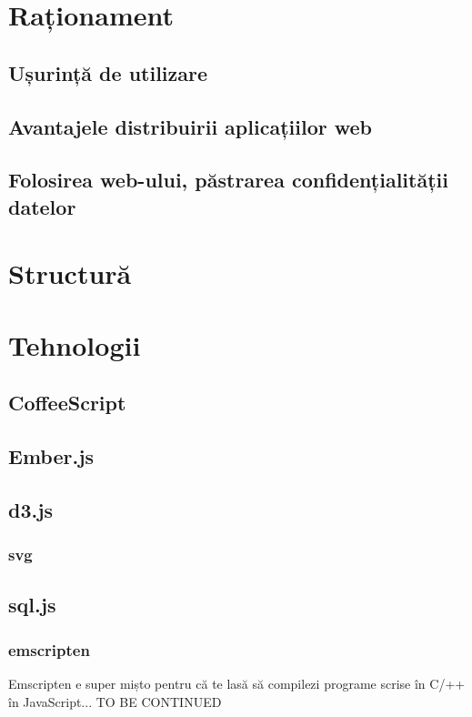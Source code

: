 \documentclass[12pt, a4paper, twoside, romanian]{teza-upb}
\begin{document}
  \section{Raționament}
  \label{sec:rationament}

    \subsection{Ușurință de utilizare}

    \subsection{Avantajele distribuirii aplicațiilor web}

    \subsection{Folosirea web-ului, păstrarea confidențialității datelor}
  \section{Structură}
  \section{Tehnologii}
    \subsection{CoffeeScript}
    \subsection{Ember.js}
    \subsection{d3.js}
      \subsubsection{svg}
    \subsection{sql.js}
      \subsubsection{emscripten}
        Emscripten e super mișto pentru că te lasă să compilezi programe scrise în C/++ în JavaScript... TO BE CONTINUED
\end{document}
